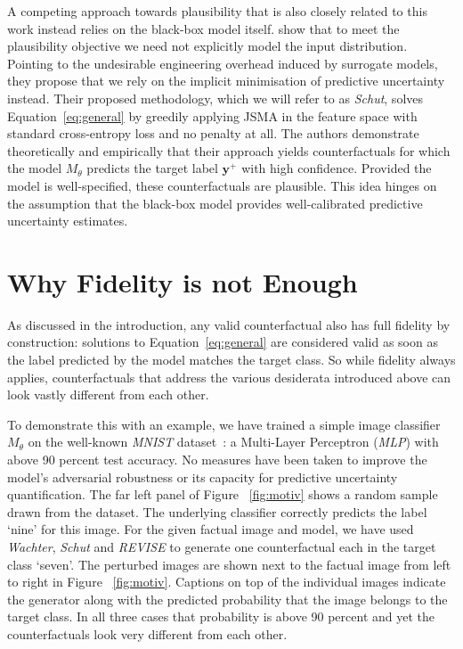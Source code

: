 \documentclass{article}
\begin{document}
A competing approach towards plausibility that is also closely related to this work instead relies on the black-box model itself. \citet{schut2021generating} show that to meet the plausibility objective we need not explicitly model the input distribution. Pointing to the undesirable engineering overhead induced by surrogate models, they propose that we rely on the implicit minimisation of predictive uncertainty instead. Their proposed methodology, which we will refer to as \textit{Schut}, solves Equation~\ref{eq:general} by greedily applying JSMA in the feature space with standard cross-entropy loss and no penalty at all. The authors demonstrate theoretically and empirically that their approach yields counterfactuals for which the model $M_{\theta}$ predicts the target label $\mathbf{y}^+$ with high confidence. Provided the model is well-specified, these counterfactuals are plausible. This idea hinges on the assumption that the black-box model provides well-calibrated predictive uncertainty estimates.

\section{Why Fidelity is not Enough}\label{fidelity}

As discussed in the introduction, any valid counterfactual also has full fidelity by construction: solutions to Equation~\ref{eq:general} are considered valid as soon as the label predicted by the model matches the target class. So while fidelity always applies, counterfactuals that address the various desiderata introduced above can look vastly different from each other. 

To demonstrate this with an example, we have trained a simple image classifier $M_{\theta}$ on the well-known \textit{MNIST} dataset~\citep{lecun1998mnist}: a Multi-Layer Perceptron (\textit{MLP}) with above 90 percent test accuracy. No measures have been taken to improve the model's adversarial robustness or its capacity for predictive uncertainty quantification. The far left panel of Figure ~\ref{fig:motiv} shows a random sample drawn from the dataset. The underlying classifier correctly predicts the label `nine' for this image. For the given factual image and model, we have used \textit{Wachter}, \textit{Schut} and \textit{REVISE} to generate one counterfactual each in the target class `seven'. The perturbed images are shown next to the factual image from left to right in Figure ~\ref{fig:motiv}. Captions on top of the individual images indicate the generator along with the predicted probability that the image belongs to the target class. In all three cases that probability is above 90 percent and yet the counterfactuals look very different from each other.
\end{document}

